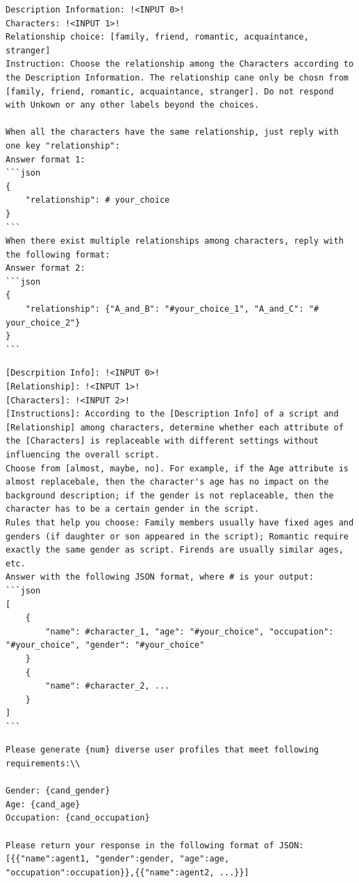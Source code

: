 \begin{tcolorbox}[width=\linewidth]
\begin{lstlisting}[caption=Relationship Extraction of Original Characters]
Description Information: !<INPUT 0>!
Characters: !<INPUT 1>!
Relationship choice: [family, friend, romantic, acquaintance, stranger]
Instruction: Choose the relationship among the Characters according to the Description Information. The relationship cane only be chosn from [family, friend, romantic, acquaintance, stranger]. Do not respond with Unkown or any other labels beyond the choices.

When all the characters have the same relationship, just reply with one key "relationship":
Answer format 1:
```json
{
    "relationship": # your_choice
}
```
When there exist multiple relationships among characters, reply with the following format:
Answer format 2:
```json
{
    "relationship": {"A_and_B": "#your_choice_1", "A_and_C": "# your_choice_2"}
}
```

\end{lstlisting}
\end{tcolorbox}

\begin{tcolorbox}[width=\linewidth]
\begin{lstlisting}[caption=Characters Attribute Replace-ability Assessment]
[Descrpition Info]: !<INPUT 0>!
[Relationship]: !<INPUT 1>!
[Characters]: !<INPUT 2>!
[Instructions]: According to the [Description Info] of a script and [Relationship] among characters, determine whether each attribute of the [Characters] is replaceable with different settings without influencing the overall script. 
Choose from [almost, maybe, no]. For example, if the Age attribute is almost replacebale, then the character's age has no impact on the background description; if the gender is not replaceable, then the character has to be a certain gender in the script.
Rules that help you choose: Family members usually have fixed ages and genders (if daughter or son appeared in the script); Romantic require exactly the same gender as script. Firends are usually similar ages, etc.
Answer with the following JSON format, where # is your output:
```json
[
    {
        "name": #character_1, "age": "#your_choice", "occupation": "#your_choice", "gender": "#your_choice"
    }
    {
        "name": #character_2, ...
    }
]
```
\end{lstlisting}
\end{tcolorbox}

\begin{tcolorbox}[width=\linewidth]
\begin{lstlisting}[caption=Agent Synthesizing]
Please generate {num} diverse user profiles that meet following requirements:\\

Gender: {cand_gender}
Age: {cand_age}
Occupation: {cand_occupation}

Please return your response in the following format of JSON:
[{{"name":agent1, "gender":gender, "age":age, "occupation":occupation}},{{"name":agent2, ...}}]
\end{lstlisting}
\end{tcolorbox}